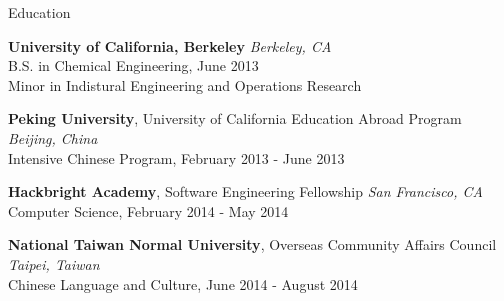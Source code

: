 \documentclass{resume} %
\begin{document}
\begin{rSection}{Education}

{\bf University of California, Berkeley} \hfill {\em Berkeley, CA} \\ 
B.S. in Chemical Engineering, June 2013 \\
Minor in Indistural Engineering and Operations Research \smallskip

{\bf Peking University}, University of California Education Abroad Program \hfill {\em Beijing, China} \\ 
Intensive Chinese Program, February 2013 - June 2013 \smallskip

{\bf Hackbright Academy}, Software Engineering Fellowship \hfill {\em San Francisco, CA} \\
Computer Science, February 2014 - May 2014 \smallskip

{\bf National Taiwan Normal University}, Overseas Community Affairs Council \hfill {\em Taipei, Taiwan} \\ 
Chinese Language and Culture, June 2014 - August 2014 \smallskip \\

\end{rSection}









\end{document}
